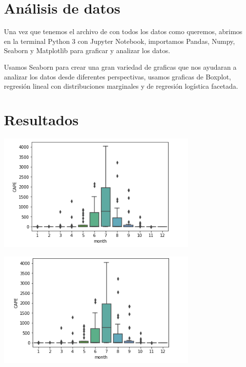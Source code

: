 \documentclass{article}
\begin{document}
\section{Análisis de datos}

Una vez que tenemos el archivo de con todos los datos como queremos, abrimos en la terminal Python 3 con Jupyter Notebook, importamos Pandas, Numpy, Seaborn y Matplotlib para graficar y analizar los datos.

Usamos Seaborn para crear una gran variedad de graficas que nos ayudaran a analizar los datos desde diferentes perspectivas, usamos graficas de Boxplot, regresión lineal con distribuciones marginales y de regresión logística facetada.

\section{Resultados}

\begin{center}
	\includegraphics[width=10cm]{00zCAPE.png}
    
\end{center}
\vspace{0.3cm}

\begin{center}
	\includegraphics[width=10cm]{12zCAPE.png}
    
\end{center}
\vspace{0.3cm}
\end{document}
